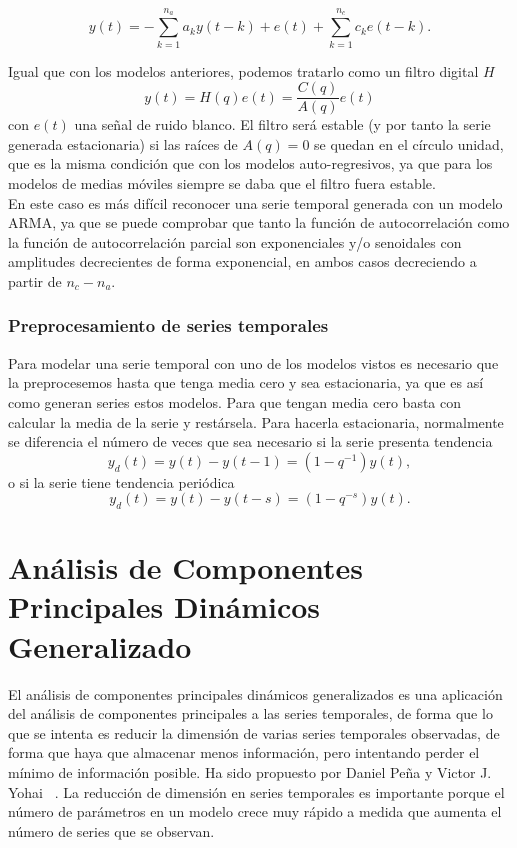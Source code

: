 \begin{equation}
y(t) = - \sum_{k=1}^{n_a} a_k y(t-k) + e(t) + \sum_{k=1}^{n_c} c_k e(t-k).
\end{equation}

Igual que con los modelos anteriores, podemos tratarlo como un filtro digital $H$
\[	y(t) = H(q)e(t) = \frac{C(q)}{A(q)}e(t)	\]
con $e(t)$ una señal de ruido blanco. El filtro será estable (y por tanto la serie generada estacionaria) si las raíces de $A(q) = 0$ se quedan en el círculo unidad, que es la misma condición que con los modelos auto-regresivos, ya que para los modelos de medias móviles siempre se daba que el filtro fuera estable.\\

En este caso es más difícil reconocer una serie temporal generada con un modelo ARMA, ya que se puede comprobar que tanto la función de autocorrelación como la función de autocorrelación parcial son exponenciales y/o senoidales con amplitudes decrecientes de forma exponencial, en ambos casos decreciendo a partir de $n_c-n_a$.

\subsubsection{Preprocesamiento de series temporales}

Para modelar una serie temporal con uno de los modelos vistos es necesario que la preprocesemos hasta que tenga media cero y sea estacionaria, ya que es así como generan series estos modelos. Para que tengan media cero basta con calcular la media de la serie y restársela. Para hacerla estacionaria, normalmente se diferencia el número de veces que sea necesario si la serie presenta tendencia
\[	y_d(t) = y(t) - y(t-1) = (1 - q^{-1})y(t),	\]
o si la serie tiene tendencia periódica
\[	y_d(t) = y(t) - y(t-s) = (1 - q^{-s})y(t).	\]


\section{Análisis de Componentes Principales Dinámicos Generalizado}

El análisis de componentes principales dinámicos generalizados es una aplicación del análisis de componentes principales a las series temporales, de forma que lo que se intenta es reducir la dimensión de varias series temporales observadas, de forma que haya que almacenar menos información, pero intentando perder el mínimo de información posible. Ha sido propuesto por Daniel Peña y Victor J. Yohai ~\cite{pena16}. La reducción de dimensión en series temporales es importante porque el número de parámetros en un modelo crece muy rápido a medida que aumenta el número de series que se observan.

